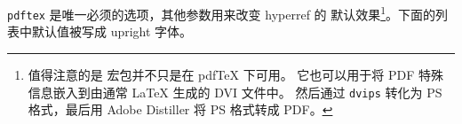 \texttt{pdftex} 是唯一必须的选项，其他参数用来改变 hyperref 的
默认效果\footnote{值得注意的是  宏包并不只是在 pdf\TeX{} 下可用。
它也可以用于将 PDF 特殊信息嵌入到由通常 \LaTeX{} 生成的 DVI 文件中。
然后通过 \texttt{dvips} 转化为 PS 格式，最后用 Adobe
Distiller 将 PS 格式转成 PDF。}。下面的列表中默认值被写成 upright 字体。



